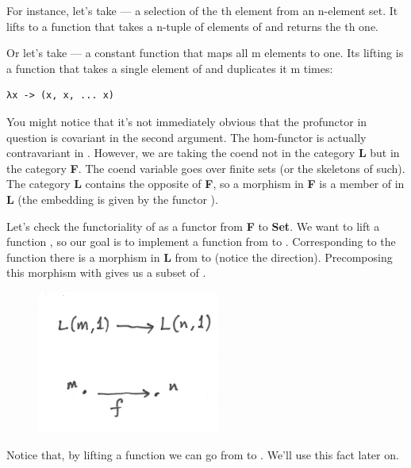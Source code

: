 \noindent
For instance, let's take  --- a
selection of the th element from an n-element set. It lifts to
a function that takes a n-tuple of elements of  and returns
the th one.

Or let's take  --- a constant
function that maps all m elements to one. Its lifting is a function that
takes a single element of  and duplicates it m times:

\begin{Verbatim}[commandchars=\\\{\}]
λx -> (x, x, ... x)
\end{Verbatim}
You might notice that it's not immediately obvious that the profunctor
in question is covariant in the second argument. The hom-functor
 is actually contravariant in . However, we
are taking the coend not in the category \textbf{L} but in the category
\textbf{F}. The coend variable  goes over finite sets (or the
skeletons of such). The category \textbf{L} contains the opposite of
\textbf{F}, so a morphism  in \textbf{F}
is a member of  in \textbf{L} (the embedding is given
by the functor ).

Let's check the functoriality of  as a functor from
\textbf{F} to \textbf{Set}. We want to lift a function
, so our goal is to implement a
function from  to . Corresponding to
the function  there is a morphism in \textbf{L} from
 to  (notice the direction). Precomposing this
morphism with  gives us a subset of
.

\begin{figure}[H]
\centering
\includegraphics[width=60mm]{images/liftl.png}
\end{figure}

\noindent
Notice that, by lifting a function  we can go
from  to . We'll use this fact later
on.

